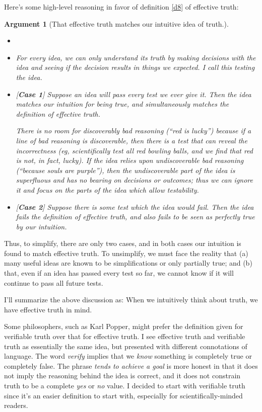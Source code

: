 \documentclass[11pt, oneside]{article}   	%
\newenvironment{answer}[1]
  {\renewcommand\theinnercustomthm{#1}\innercustomthm}
  {\endinnercustomthm}
\newtheorem{argt}{Argument}
\begin{document}
Here's some high-level reasoning in favor of definition \ref{d8} of
effective truth:
\begin{argt}[That effective truth matches our intuitive idea of truth.]
    \label{a1}
    \normalfont
\begin{itemize}
    \item[]
    \item For every idea, we can only understand its truth by making decisions
        with the idea and seeing if the decision results in things we expected.
        I call this {\em testing the idea.}
    \item{} [{\bf Case 1}]
        Suppose an idea will pass every test we ever give it. Then
        the idea
        matches our intuition for being true, and simultaneously matches the
        definition of effective truth.

        There is no room for discoverably
        bad reasoning (``red is lucky'')
        because if a line of bad reasoning is discoverable,
        then there is a test that can reveal the incorrectness
        (eg, scientifically test all red bowling balls, and we find that red is
        not, in fact, lucky).
        If the idea
        relies upon undiscoverable bad reasoning (``because souls are purple''),
        then the undiscoverable part of the idea is superfluous and has no
        bearing on decisions or outcomes; thus we can ignore it and focus on the
        parts of the idea which allow testability.
    \item{} [{\bf Case 2}]
        Suppose there is some test which the idea would fail.
        Then the idea fails the definition of
        effective truth, and also fails to be seen as perfectly true by our
        intuition.
\end{itemize}
\end{argt}
Thus, to simplify, there are only two cases, and in both cases our intuition is
found to match effective truth. To unsimplify, we must face the reality that (a)
many useful ideas are known to be simplifications or only partially true; and
(b) that, even if an idea has passed every test so far, we cannot know if it
will continue to pass all future tests.

I'll summarize the above discussion as:
\begin{answer}{3b.}
    When we intuitively think about truth, we have effective truth in mind.
\end{answer}

Some philosophers, such as Karl Popper, might prefer the definition given for
verifiable truth over that for effective truth.
I see effective truth and verifiable truth as essentially the
same idea, but presented with different connotations of language. The word {\em
verify} implies that we {\em know} something is completely true or completely
false. The phrase {\em tends to achieve a goal}
is more honest in that it does not imply the reasoning behind the idea is
correct, and it does not constrain truth to be a complete {\em yes} or {\em no}
value. I decided to start with verifiable truth since it's an easier definition
to start with, especially for scientifically-minded readers.
\end{document}
